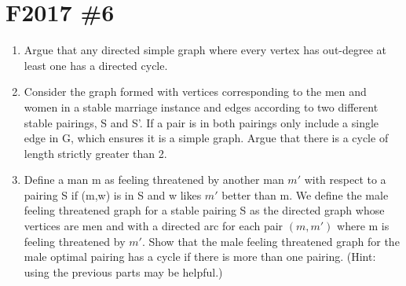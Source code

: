 \documentclass{article}
\begin{document}
\section{F2017 \#6}
\begin{enumerate}
    \item Argue that any directed simple graph where every vertex has out-degree at least one has a directed cycle.
    \ \\
    \begin{solution}
    \end{solution}
    \item Consider the graph formed with vertices corresponding to the men and women in a stable marriage instance and edges according to two different stable pairings, S and S'. If a pair is in both pairings only include a single edge in G, which ensures it is a simple graph. Argue that there is a cycle of length strictly greater than 2.
    \ \\
    \begin{solution}
    \end{solution}
    \item Define a man m as feeling threatened by another man $m'$ with respect to a pairing S if (m,w) is in S and w likes $m'$ better than m. We define the male feeling threatened graph for a stable pairing S as the directed graph whose vertices are men and with a directed arc for each pair $(m, m')$ where m is feeling threatened by $m'$. Show that the male feeling threatened graph for the male optimal pairing has a cycle if there is more than one pairing. (Hint: using the previous parts may be helpful.)
    \ \\ 
\end{enumerate}
\end{document}
